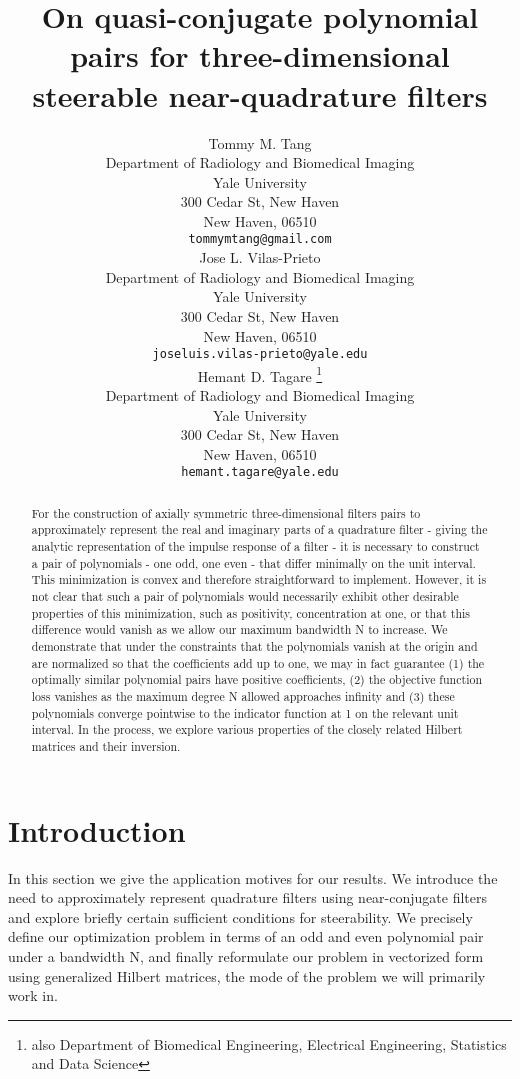 \documentclass{article}
\title{On quasi-conjugate polynomial pairs for three-dimensional steerable near-quadrature filters}
\author{
 Tommy M. Tang  \\
  Department of Radiology and Biomedical Imaging\\
  Yale University\\
   300 Cedar St, New Haven\\
  New Haven, 06510 \\
  \texttt{tommymtang@gmail.com} \\
  \And 
  Jose L. Vilas-Prieto\\
   Department of Radiology and Biomedical Imaging\\
  Yale University\\
   300 Cedar St, New Haven\\
  New Haven, 06510 \\
  \texttt{joseluis.vilas-prieto@yale.edu} \\
   \And
 Hemant D. Tagare \thanks{also Department of Biomedical Engineering, Electrical Engineering, Statistics and Data Science} \\
 Department of Radiology and Biomedical Imaging\\
 Yale University\\
 300 Cedar St, New Haven\\
  New Haven, 06510 \\
  \texttt{hemant.tagare@yale.edu} \\
}
\theoremstyle{definition}
\theoremstyle{remark}
\numberwithin{equation}{section}
\begin{document}
\maketitle

\begin{abstract}
For the construction of axially symmetric three-dimensional filters pairs to approximately represent the real and imaginary parts of a quadrature filter - giving the analytic representation of the impulse response of a filter - it is necessary to construct a pair of polynomials - one odd, one even - that differ minimally on the unit interval. This minimization is convex and therefore straightforward to implement. However, it is not clear that such a pair of polynomials would necessarily exhibit other desirable properties of this minimization, such as positivity, concentration at one, or that this difference would vanish as we allow our maximum bandwidth N to increase. We demonstrate that under the constraints that the polynomials vanish at the origin and are normalized so that the coefficients add up to one, we may in fact guarantee (1) the optimally similar polynomial pairs have positive coefficients, (2) the objective function loss vanishes as the maximum degree N allowed approaches infinity and (3) these polynomials converge pointwise to the indicator function at 1 on the relevant unit interval. In the process, we explore various properties of the closely related Hilbert matrices and their inversion. 
\end{abstract}




\section{Introduction}
\label{Introduction}
In this section we give the application motives for our results. We introduce the need to approximately represent quadrature filters using near-conjugate filters and explore briefly certain sufficient conditions for steerability. We precisely define our optimization problem in terms of an odd and even polynomial pair under a bandwidth N, and finally reformulate our problem in vectorized form using generalized Hilbert matrices, the mode of the problem we will primarily work in.
\end{document}
